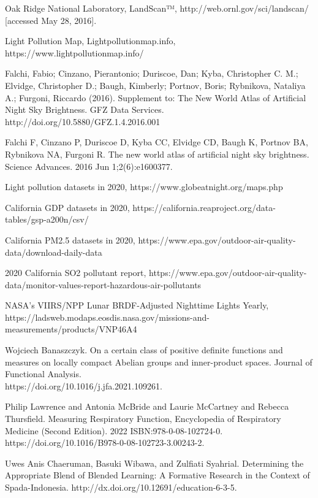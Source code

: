 \documentclass{mcmthesis}
\begin{document}
\newpage
\begin{thebibliography}{99}
 Oak Ridge National Laboratory, LandScan™, http://web.ornl.gov/sci/landscan/ [accessed May 28, 2016].

 Light Pollution Map, Lightpollutionmap.info, https://www.lightpollutionmap.info/

 Falchi, Fabio; Cinzano, Pierantonio; Duriscoe, Dan; Kyba, Christopher C. M.; Elvidge, Christopher D.; Baugh, Kimberly; Portnov, Boris; Rybnikova, Nataliya A.; Furgoni, Riccardo (2016). Supplement to: The New World Atlas of Artificial Night Sky Brightness. GFZ Data Services. http://doi.org/10.5880/GFZ.1.4.2016.001

 Falchi F, Cinzano P, Duriscoe D, Kyba CC, Elvidge CD, Baugh K, Portnov BA, Rybnikova NA, Furgoni R. The new world atlas of artificial night sky brightness. Science Advances. 2016 Jun 1;2(6):e1600377.

 Light pollution datasets in 2020, https://www.globeatnight.org/maps.php

 California GDP datasets in 2020, https://california.reaproject.org/data-tables/gsp-a200n/csv/

 California PM2.5 datasets in 2020, https://www.epa.gov/outdoor-air-quality-data/download-daily-data

 2020 California SO2 pollutant report, https://www.epa.gov/outdoor-air-quality-data/monitor-values-report-hazardous-air-pollutants

  NASA's VIIRS/NPP Lunar BRDF-Adjusted Nighttime Lights Yearly, https://ladsweb.modaps.eosdis.nasa.gov/missions-and-measurements/products/VNP46A4

 Wojciech Banaszczyk. On a certain class of positive definite functions and measures on locally compact Abelian groups and inner-product spaces. Journal of Functional Analysis. \\https://doi.org/10.1016/j.jfa.2021.109261.

 Philip Lawrence and Antonia McBride and Laurie McCartney and Rebecca Thursfield. Measuring Respiratory Function, Encyclopedia of Respiratory Medicine (Second Edition). 2022 ISBN:978-0-08-102724-0. \\https://doi.org/10.1016/B978-0-08-102723-3.00243-2.

 Uwes Anis Chaeruman, Basuki Wibawa, and Zulfiati Syahrial. Determining the Appropriate Blend of Blended Learning: A Formative Research in the Context of Spada-Indonesia. http://dx.doi.org/10.12691/education-6-3-5.


\end{thebibliography}
\end{document}
